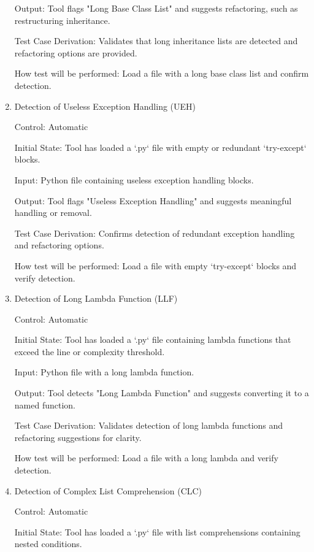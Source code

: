 \documentclass[12pt, titlepage]{article}
\begin{document}
\begin{enumerate}
Output: Tool flags "Long Base Class List" and suggests refactoring, such as restructuring inheritance.

Test Case Derivation: Validates that long inheritance lists are detected and refactoring options are provided.
					
How test will be performed: Load a file with a long base class list and confirm detection.

\item{Detection of Useless Exception Handling (UEH)\\}

Control: Automatic
					
Initial State: Tool has loaded a `.py` file with empty or redundant `try-except` blocks.
					
Input: Python file containing useless exception handling blocks.
					
Output: Tool flags "Useless Exception Handling" and suggests meaningful handling or removal.

Test Case Derivation: Confirms detection of redundant exception handling and refactoring options.
					
How test will be performed: Load a file with empty `try-except` blocks and verify detection.

\item{Detection of Long Lambda Function (LLF)\\}

Control: Automatic
					
Initial State: Tool has loaded a `.py` file containing lambda functions that exceed the line or complexity threshold.
					
Input: Python file with a long lambda function.
					
Output: Tool detects "Long Lambda Function" and suggests converting it to a named function.

Test Case Derivation: Validates detection of long lambda functions and refactoring suggestions for clarity.
					
How test will be performed: Load a file with a long lambda and verify detection.

\item{Detection of Complex List Comprehension (CLC)\\}

Control: Automatic
					
Initial State: Tool has loaded a `.py` file with list comprehensions containing nested conditions.
					

\end{enumerate}
\end{document}
